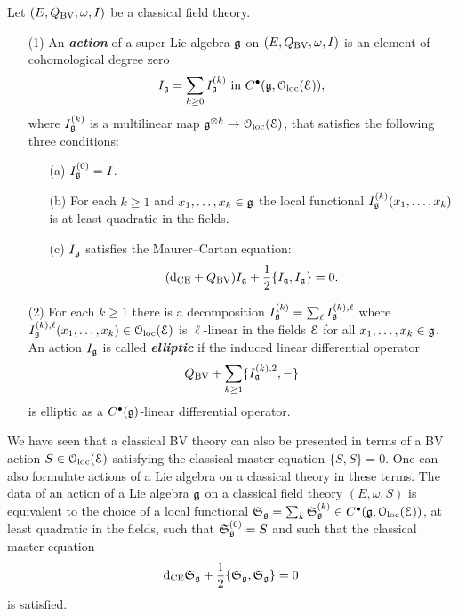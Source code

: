 \documentclass[10pt, oneside]{article}
\newcommand{\defterm}[1]{\textbf{\emph{#1}}}
\begin{document}
\begin{definition}
\label{infinitesimal_action_def}
Let $(E, Q_{\mathrm{BV}},\omega, I)$ be a classical field theory. 
\begin{itemize}
\item[(1)]
An \defterm{action} of a super Lie algebra $\mathfrak g$ on $(E, Q_{\mathrm{BV}}, \omega, I)$ is an element of cohomological degree zero 
\[I_\mathfrak g = \sum_{k\geq 0} I_{\mathfrak g}^{(k)} \text{ in } C^\bullet(\mathfrak g, \mathcal{O}_{\rm loc}(\mathcal E)),\]
where $I_\mathfrak g^{(k)}$ is a multilinear map $\mathfrak g^{\otimes k} \to \mathcal{O}_{\rm loc}(\mathcal E)$, that satisfies the following three conditions:
\begin{itemize}
\item[(a)] $I_\mathfrak g^{(0)} = I$.
\item[(b)] For each $k \geq 1$ and $x_1, \ldots, x_k \in \mathfrak g$ the local functional $I^{(k)}_\mathfrak g (x_1,\ldots, x_k)$ is at least quadratic in the fields.
\item[(c)] $I_\mathfrak g$ satisfies the Maurer--Cartan equation:
\[({\rm d}_{\mathrm{CE}} + Q_{\mathrm{BV}}) I_\mathfrak g + \frac{1}{2} \{I_\mathfrak g, I_\mathfrak g\} = 0.\]
\end{itemize}
\item[(2)]
For each $k \geq 1$ there is a decomposition $I_\mathfrak g^{(k)} = \sum_{\ell} I_\mathfrak g^{(k),\ell}$ where $ I_\mathfrak g^{(k),\ell}(x_1,\ldots,x_k) \in \mathcal{O}_{\rm loc}(\mathcal E)$ is $\ell$-linear in the fields $\mathcal E$ for all $x_1,\ldots,x_k \in \mathfrak g$.
An action $I_\mathfrak g$ is called \defterm{elliptic} if the induced linear differential operator
\[
Q_{\mathrm{BV}} + \sum_{k \geq 1} \{I_\mathfrak g^{(k),2}, -\}
\]
is elliptic as a $C^\bullet(\mathfrak g)$-linear differential operator.
\end{itemize}
\end{definition}

\begin{rmk}
\end{rmk}

\begin{rmk}
We have seen that a classical BV theory can also be presented in terms of a BV action $S \in \mathcal{O}_{\rm loc}(\mathcal E)$ satisfying the classical master equation $\{S, S\} = 0$. 
One can also formulate actions of a Lie algebra on a classical theory in these terms. 
The data of an action of a Lie algebra $\mathfrak g$ on a classical field theory $(E, \omega, S)$ is equivalent to the choice of a local functional $\mathfrak S_\mathfrak g = \sum_k \mathfrak S_\mathfrak g^{(k)}\in C^\bullet(\mathfrak g, \mathcal{O}_{\rm loc}(\mathcal E))$, at least quadratic in the fields, such that $\mathfrak S^{(0)}_\mathfrak g = S$ and such that the classical master equation
\[
{\rm d}_{\mathrm{CE}} \mathfrak S_\mathfrak g + \frac{1}{2} \{\mathfrak S_\mathfrak g, \mathfrak S_\mathfrak g\} = 0 
\]
is satisfied.
\end{rmk}
\end{document}
